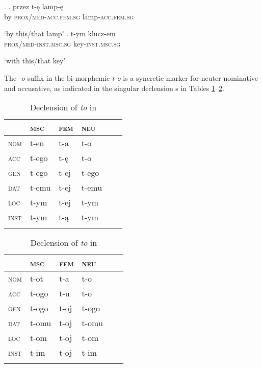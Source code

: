 \ex.\label{przezlampe}
\ag. przez t-\k{e} lamp-\k{e}\\
by \textsc{prox/med-acc.fem.sg} lamp-\textsc{acc.fem.sg}\\
\strut `by this/that lamp'
\bg. t-ym klucz-em\\
\textsc{prox/med-inst.msc.sg} key-\textsc{inst.msc.sg}\\
\strut `with this/that key'

The \textit{-o} suffix in the bi-morphemic \textit{t-o} is a syncretic marker for neuter nominative and accusative, as indicated in the singular declension s in Tables \ref{to:decl}--\ref{to:Rus-decl}.
  

\begin{table}
\caption{Declension of \textit{to} in }
\label{to:decl} 
\begin{tabular}[t]{ l l l l l l }
\lsptoprule	
& \textsc{msc} & \textsc{fem} & \textsc{neu}\\\hline
  \textsc{nom} & t-en & t-a & t-o\cellcolor[gray]{0.9}\\
  \textsc{acc}  & t-ego & t-\k{e} & t-o\cellcolor[gray]{0.9}\\
  \textsc{gen} & t-ego & t-ej & t-ego\\
  \textsc{dat} & t-emu & t-ej & t-emu\\
  \textsc{loc}  & t-ym & t-ej & t-ym\\
  \textsc{inst} & t-ym & t-\k{a} & t-ym\\
  \lspbottomrule
\end{tabular}
\end{table}

\begin{table}
\caption{Declension of \textit{to} in }
\label{to:Rus-decl}
\begin{tabular}[t]{ l l l l l l }
\lsptoprule	
& \textsc{msc} & \textsc{fem} & \textsc{neu}\\\hline
  \textsc{nom} & t-ot & t-a & t-o\cellcolor[gray]{0.9}\\
  \textsc{acc}  & t-ogo & t-u & t-o\cellcolor[gray]{0.9}\\
  \textsc{gen} & t-ogo & t-oj & t-ogo\\
  \textsc{dat}  & t-omu & t-oj & t-omu\\
  \textsc{loc} & t-om & t-oj & t-om\\
  \textsc{inst} & t-im & t-oj & t-im\\
  \lspbottomrule
\end{tabular}
\end{table}

